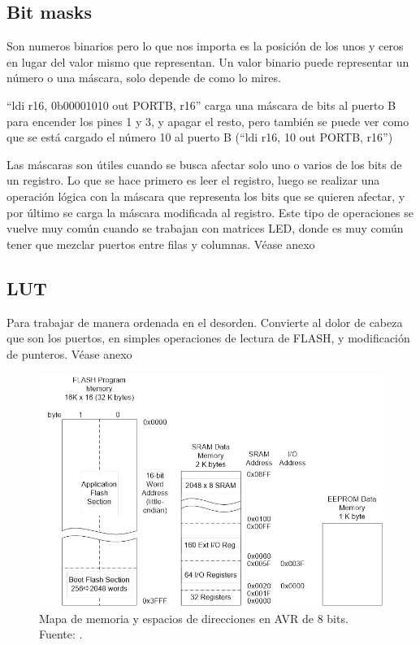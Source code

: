 \subsection{Bit masks}
Son numeros binarios pero lo que nos importa es la posición de los unos y ceros en lugar del valor mismo que representan. Un valor binario puede representar un número o una máscara, solo depende de como lo mires.  

``ldi r16, 0b00001010 out PORTB, r16'' carga una máscara de bits al puerto B para encender los pines 1 y 3, y apagar el resto, pero también se puede ver como que se está cargado el número 10 al puerto B (``ldi r16, 10 out PORTB, r16'')

Las máscaras son útiles cuando se busca afectar solo uno o varios de los bits de un registro. Lo que se hace primero es leer el registro, luego se realizar una operación lógica con la máscara que representa los bits que se quieren afectar, y por último se carga la máscara modificada al registro. Este tipo de operaciones se vuelve muy común cuando se trabajan con matrices LED, donde es muy común tener que mezclar puertos entre filas y columnas. Véase anexo %


\subsection{LUT}
Para trabajar de manera ordenada en el desorden. Convierte al dolor de cabeza que son los puertos, en simples operaciones de lectura de FLASH, y modificación de punteros. Véase anexo %



\begin{figure}[H]
  \centering
  \includegraphics[width=\linewidth]{./Anexos/Memory Map.jpg}
  \caption{Mapa de memoria y espacios de direcciones en AVR de 8 bits. Fuente: \cite{arxterra_avr_addressing_modes}.}
  \label{fig:avr-memory-map}
\end{figure}

